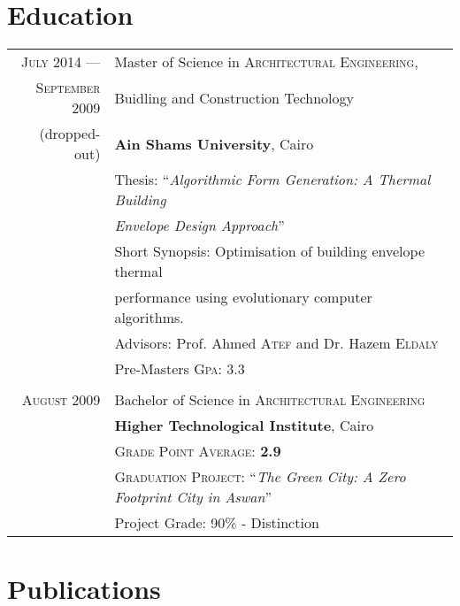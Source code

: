 \documentclass[a4paper,11pt]{article} %
\begin{document}
\section{Education}

\begin{tabular}{r|l}	
\textsc{July} 2014 --- & Master of Science in \textsc{Architectural Engineering},\\ 
\textsc{September} 2009 & Buidling and Construction Technology\\
\small(dropped-out)& \textbf{Ain Shams University}, Cairo \\
& Thesis: ``\emph{Algorithmic Form Generation: A Thermal Building}\\
&\emph{Envelope Design Approach}'' \\
&\small Short Synopsis: Optimisation of building envelope thermal\\
&\small performance using evolutionary computer algorithms.\\
& \small Advisors: Prof. Ahmed \textsc{Atef} and Dr. Hazem \textsc{Eldaly}\\
&\normalsize Pre-Masters \textsc{Gpa}: 3.3\\
\multicolumn{2}{c}{} \\


\textsc{August} 2009& Bachelor of Science in \textsc{Architectural Engineering} \\
& \normalsize\textbf{Higher Technological Institute}, Cairo\\
&\small \textsc{Grade Point Average}: \textbf{2.9} \\
&\small \textsc{Graduation Project:} ``\emph{The Green City: A Zero Footprint City in Aswan}''\\
&\small Project Grade: 90\% - Distinction\\

\end{tabular}




\vspace{1cm}
\section{Publications}
\end{document}
